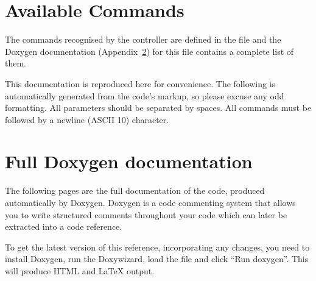 \documentclass[11pt]{report}
\begin{document}
\begin{appendices}



\chapter{Available Commands} %
\label{chap:available_commands}

The commands recognised by the controller are defined in the file  and the Doxygen documentation (Appendix~\ref{chap:full_doxygen_documentation}) for this file contains a complete list of them. 

This documentation is reproduced here for convenience. The following is automatically generated from the code's markup, so please excuse any odd formatting. All parameters should be separated by spaces. All commands must be followed by a newline (ASCII 10) character. 

\def\Hypertarget{{}}
\renewcommand{\Hypertarget}[1]{}


\chapter{Full Doxygen documentation} %
\label{chap:full_doxygen_documentation}

The following pages are the full documentation of the code, produced automatically by Doxygen. Doxygen is a code commenting system that allows you to write structured comments throughout your code which can later be extracted into a code reference.

To get the latest version of this reference, incorporating any changes, you need to install Doxygen, run the Doxywizard, load the file  and click ``Run doxygen''. This will produce HTML and \LaTeX{} output. 


\end{appendices}
\end{document}
